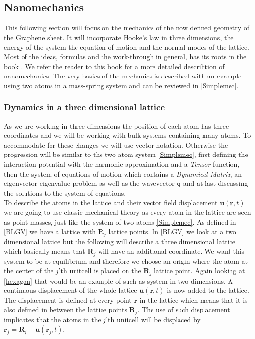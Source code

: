 
\subsection{Nanomechanics}
This following section will focus on the mechanics of the now defined geometry of the Graphene sheet. It will incorporate Hooke's law in three dimensions, the energy of the system the equation of motion and the normal modes of the lattice. Most of the ideas, formulas and the work-through in general, has its roots in the book . We refer the reader to this book for a more detailed describtion of nanomechanics. The very basics of the mechanics is described with an example using two atoms in a mass-spring system and can be reviewed in \cref{Simplemec}. 
\subsubsection{Dynamics in a three dimensional lattice} As we are working in three dimensions the position of each atom has three coordinates and we will be working with bulk systems containing many atoms. To accommodate for these changes we will use vector notation. Otherwise the progression will be similar to the two atom system \cref{Simplemec}, first defining the interaction potential with the harmonic approximation and a \textit{Tensor} function, then the system of equations of motion which contains a \textit{Dynamical Matrix}, an eigenvector-eigenvalue problem as well as the wavevector $\textbf{q}$ and at last discussing the solutions to the system of equations.\\
To describe the atoms in the lattice and their vector field displacement $\mathbf{u}(\mathbf{r},t)$ we are going to use classic mechanical theory as every atom in the lattice are seen as point masses, just like the system of two atoms \cref{Simplemec}. As defined in \cref{BLGV} we have a lattice with $\mathbf{R}_{j}$ lattice points. In \cref{BLGV} we look at a two dimensional lattice but the following will describe a three dimensional lattice which basically means that $\mathbf{R}_{j}$ will have an additional coordinate. We want this system to be at equilibrium and therefore we choose an origin where the atom at the center of the $j$'th unitcell is placed on the $\mathbf{R}_{j}$ lattice point. Again looking at \cref{hexagon} that would be an example of such as system in two dimensions. A continuous displacement of the whole lattice $\mathbf{u}(\mathbf{r},t)$ is now added to the lattice. The displacement is defined at every point $\mathbf{r}$ in the lattice which means that it is also defined in between the lattice points $\mathbf{R}_{j}$. The use of such displacement implicates that the atoms in the $j$'th unitcell will be displaced by $\mathbf{r}_{j}=\mathbf{R}_{j}+\mathbf{u}(\mathbf{r}_{j},t)$.\\
